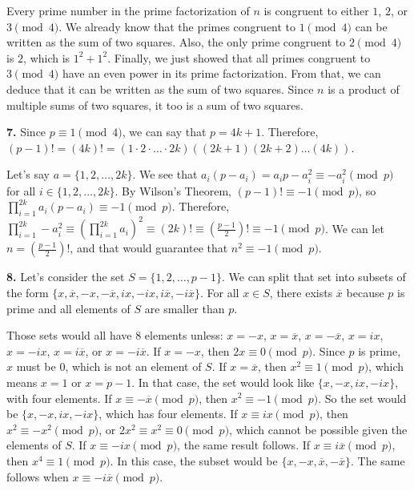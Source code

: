 \documentclass{article}
\begin{document}
Every prime number in the prime factorization of $n$ is congruent to either $1$, $2$, or $3 \pmod{4}$. We already know that the primes congruent to $1 \pmod{4}$ can be written as the sum of two squares. Also, the only prime congruent to $2 \pmod{4}$ is $2$, which is $1^2 + 1^2$. Finally, we just showed that all primes congruent to $3 \pmod{4}$ have an even power in its prime factorization. From that, we can deduce that it can be written as the sum of two squares. Since $n$ is a product of multiple sums of two squares, it too is a sum of two squares.
\newline

\textbf{7.} Since $p \equiv 1 \pmod{4}$, we can say that $p = 4k + 1$. Therefore, $(p - 1)! = (4k)! = (1 \cdot 2 \cdot \ldots \cdot 2k)((2k + 1)(2k + 2) \ldots (4k))$.
\newline

Let's say $a = \{1, 2, \ldots, 2k\}$. We see that $a_i(p - a_i) = a_ip - a_i^2 \equiv -a_i^2 \pmod{p}$ for all $i \in \{1, 2, \ldots, 2k\}$. By Wilson's Theorem, $(p - 1)! \equiv -1 \pmod{p}$, so $\prod_{i = 1}^{2k} a_i(p - a_i) \equiv -1 \pmod{p}$. Therefore, $\prod_{i = 1}^{2k} -a_i^2 \equiv \left(\prod_{i = 1}^{2k} a_i\right)^2 \equiv (2k)! \equiv \left(\frac{p - 1}{2}\right)! \equiv -1 \pmod{p}$. We can let $n = \left(\frac{p - 1}{2}\right)!$, and that would guarantee that $n^2 \equiv -1 \pmod{p}$.
\newline

\textbf{8.} Let's consider the set $S = \{1, 2, \ldots , p - 1\}$. We can split that set into subsets of the form $\{x, \overline{x}, -x, -\overline{x}, ix, -ix, i\overline{x}, -i\overline{x}\}$. For all $x \in S$, there exists $\overline{x}$ because $p$ is prime and all elements of $S$ are smaller than $p$.
\newline

Those sets would all have $8$ elements unless: $x = -x$, $x = \overline{x}$, $x = -\overline{x}$, $x = ix$, $x = -ix$, $x = i\overline{x}$, or $x = -i\overline{x}$. If $x = -x$, then $2x \equiv 0 \pmod{p}$. Since $p$ is prime, $x$ must be $0$, which is not an element of $S$. If $x = \overline{x}$, then $x^2 \equiv 1 \pmod{p}$, which means $x = 1$ or $x = p - 1$. In that case, the set would look like $\{x, -x, ix, -ix\}$, with four elements. If $x \equiv -\overline{x} \pmod{p}$, then $x^2 \equiv -1 \pmod{p}$. So the set would be $\{x, -x, ix, -ix\}$, which has four elements. If $x \equiv ix \pmod{p}$, then $x^2 \equiv -x^2 \pmod{p}$, or $2x^2 \equiv x^2 \equiv 0 \pmod{p}$, which cannot be possible given the elements of $S$. If $x \equiv -ix \pmod{p}$, the same result follows. If $x \equiv i\overline{x} \pmod{p}$, then $x^4 \equiv 1 \pmod{p}$. In this case, the subset would be $\{x, -x, \overline{x}, -\overline{x}\}$. The same follows when $x \equiv -i\overline{x} \pmod{p}$.
\newline
\end{document}
